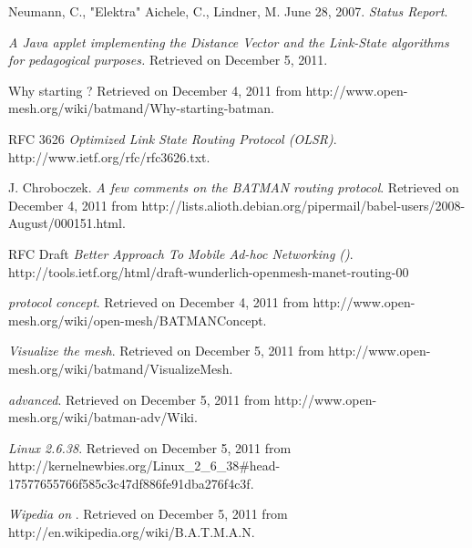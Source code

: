 \documentclass[a4paper]{article}
\begin{document}
\begin{thebibliography}{99}


   Neumann, C., "Elektra" Aichele, C., Lindner, M.
  June 28, 2007. \emph{\batman Status Report}. 

   \emph{A Java applet implementing the Distance Vector
  and the Link-State algorithms for pedagogical purposes.} Retrieved on December
  5, 2011.

   Why starting \batman? Retrieved on December 4, 2011
  from http://www.open-mesh.org/wiki/batmand/Why-starting-batman. 

   RFC 3626 \emph{Optimized Link State Routing Protocol (OLSR)}.
  http://www.ietf.org/rfc/rfc3626.txt.

   J. Chroboczek. \emph{A few comments on the BATMAN
  routing protocol}.  Retrieved on December 4, 2011 from
  http://lists.alioth.debian.org/pipermail/babel-users/2008-August/000151.html.

   RFC Draft \emph{Better Approach To Mobile Ad-hoc
  Networking (\batman)}.
  http://tools.ietf.org/html/draft-wunderlich-openmesh-manet-routing-00

   \emph{\batman protocol concept}. Retrieved on
  December 4, 2011 from http://www.open-mesh.org/wiki/open-mesh/BATMANConcept.

   \emph{Visualize the mesh}. Retrieved on December 5, 2011
  from http://www.open-mesh.org/wiki/batmand/VisualizeMesh.

   \emph{\batman advanced}. Retrieved on December 5, 2011
  from http://www.open-mesh.org/wiki/batman-adv/Wiki.

   \emph{Linux 2.6.38}. Retrieved on December 5,
  2011 from
  http://kernelnewbies.org/Linux\_2\_6\_38\#head-17577655766f585c3c47df886fe91dba276f4c3f.

   \emph{Wipedia on \batman}. Retrieved on December 5,
  2011 from http://en.wikipedia.org/wiki/B.A.T.M.A.N.

\end{thebibliography}
\end{document}
